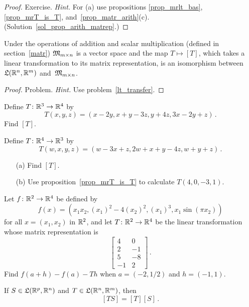 \begin{proof} Exercise. \emph{Hint.}  For (a) use propositions \ref{prop_mrlt_bas},
\ref{prop_mrT_is_T}, and~\ref{prop_matr_arith}(c). (Solution~\ref{sol_prop_arith_matrep}.) \ns
\end{proof}

\begin{thm}  Under the operations of addition and scalar multiplication (defined in
section~\ref{matr}) $\mathfrak{M}_{m \times n}$ is a vector space and the map $T \mapsto [T]$,
which takes a linear transformation to its matrix representation, is an isomorphism between
$\mathfrak{L}(\mathbb{R}^n,\mathbb{R}^m)$ and~$\mathfrak{M}_{m \times n}$.
\end{thm}

\begin{proof} Problem. \emph{Hint.} Use problem~\ref{lt_transfer}. \ns  \end{proof}

\begin{prob} Define $T \colon \mathbb{R}^3 \rightarrow \mathbb{R}^4$ by
  \[ T(x,y,z) = (x - 2y, x + y - 3z, y + 4z, 3x - 2y + z)\,. \]
Find $[T]$.
\end{prob}

\begin{prob} Define $T \colon \mathbb{R}^4 \rightarrow \mathbb{R}^3$ by
  \[ T(w,x,y,z) = (w - 3x + z, 2w + x + y - 4z, w + y + z)\,. \]
 \begin{enumerate}
  \item[(a)] Find $[T]$.
  \item[(b)] Use proposition~\ref{prop_mrT_is_T} to calculate $T(4,0,-3,1)$.
 \end{enumerate}
\end{prob}

\begin{prob} Let $f \colon \mathbb{R}^2 \rightarrow \mathbb{R}^4$ be defined by
  \[ f(x) = (x_1x_2, (x_1)^2 - 4(x_2)^2, (x_1)^3, x_1\sin(\pi x_2)) \]
for all $x = (x_1, x_2)$ in $\mathbb{R}^2$, and let $T \colon \mathbb{R}^2 \rightarrow \mathbb{R}^4$ be the linear
transformation whose matrix representation is
 \[ \begin{bmatrix}
          4 &  0 \\
          2 & -1 \\
          5 & -8 \\
         -1 &  2
    \end{bmatrix}\,. \]
Find $f(a + h) - f(a) - Th$ when $a = (-2,1/2)$ and $h = (-1,1)$.
\end{prob}

\begin{prop}\label{prop_comp_mrlt} If $S \in \mathfrak{L}(\mathbb{R}^p,\mathbb{R}^n)$ and
$T \in \mathfrak{L}(\mathbb{R}^n,\mathbb{R}^m)$, then
  \[ [TS] = [T] [S]\,. \]
\end{prop}

